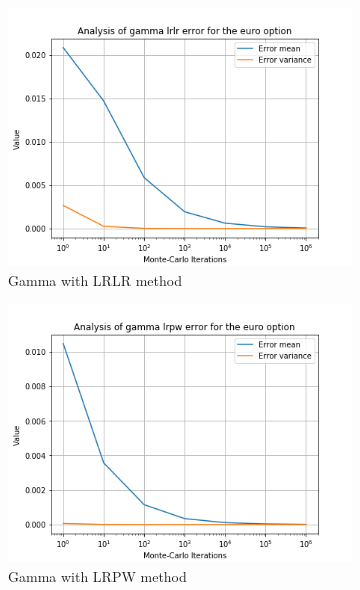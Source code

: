 \documentclass[12pt,a4paper,fleqn]{article}
\begin{document}
\begin{figure}
      \begin{subfigure}[b]{0.3\textwidth}
          \includegraphics[width=\textwidth]{graphs/eurogammalrlr.png}
          \caption{Gamma with LRLR method}
      \end{subfigure}
      \begin{subfigure}[b]{0.3\textwidth}
          \includegraphics[width=\textwidth]{graphs/eurogammalrpw.png}
          \caption{Gamma with LRPW method}
      \end{subfigure}
      \begin{subfigure}[b]{0.3\textwidth}

\end{subfigure}
\end{figure}
\end{document}

